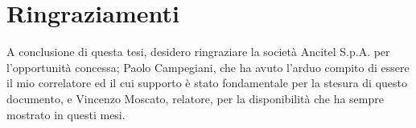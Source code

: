 \section*{Ringraziamenti}
A conclusione di questa tesi, desidero ringraziare la società Ancitel S.p.A. per l'opportunità concessa; Paolo Campegiani, che ha avuto l'arduo compito di essere il mio correlatore ed il cui supporto è stato fondamentale per la stesura di questo documento, e Vincenzo Moscato, relatore, per la disponibilità che ha sempre mostrato in questi mesi.

\clearpage{\pagestyle{empty}\cleardoublepage}
